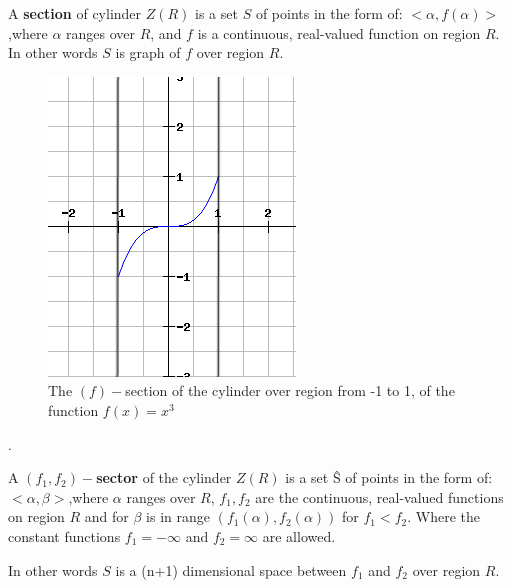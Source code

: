 \documentclass[
  digital, %
  twoside, %
  table,   %
  nolof,     %
  nolot,     %
]{fithesis3}
\begin{document}
\begin{definition}
A \textbf{section} of cylinder $Z(R)$ is a set $S$ of points in the form of: $<\alpha, f(\alpha)>$,where $\alpha$ ranges over $R$, and $f$ is a continuous, real-valued function on region $R$. In other words $S$ is graph of $f$ over region $R$.
\end{definition}

\begin{figure}[H]
  \begin{center}
      \begin{minipage}{.4\textwidth}
          \includegraphics[width=\textwidth]{fithesis/images/section.png}
    \end{minipage}
  \end{center}
  \caption{The $(f)-$section of the cylinder over region from -1 to 1, of the function $f(x) = x^3$}
\end{figure}.

\begin{definition}
A \textbf{$(f_1, f_2)-$sector} of the cylinder $Z(R)$ is a set \^{S} of points in the form of: $<\alpha, \beta>$,where $\alpha$ ranges over $R$, $f_1, f_2$ are the continuous, real-valued functions on region $R$ and for $\beta$ is in range $(f_1(\alpha), f_2(\alpha))$ for $f_1 < f_2$. Where the constant functions $f_1 = -\infty$ and $f_2 = \infty$ are allowed.

In other words $S$ is a (n+1) dimensional space  between $f_1$ and $f_2$ over region $R$.
\end{definition}
\end{document}
